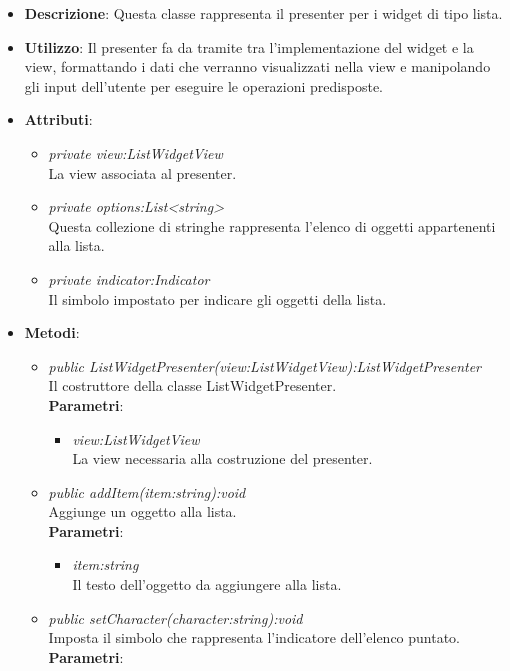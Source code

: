 \begin{itemize}
\item \textbf{Descrizione}: Questa classe rappresenta il presenter per i widget di tipo lista.
\item \textbf{Utilizzo}: Il presenter fa da tramite tra l'implementazione del widget e la view, formattando i dati che verranno visualizzati nella view e manipolando gli input dell'utente per eseguire le operazioni predisposte.
\item \textbf{Attributi}:
	\begin{itemize}
	\item \textit{private view:ListWidgetView}\\
	La view associata al presenter.
	\item \textit{private options:List<string>}\\
	Questa collezione di stringhe rappresenta l'elenco di oggetti appartenenti alla lista.
	\item \textit{private indicator:Indicator}\\
	Il simbolo impostato per indicare gli oggetti della lista.
	\end{itemize}
\item \textbf{Metodi}:
	\begin{itemize}
	\item \textit{public ListWidgetPresenter(view:ListWidgetView):ListWidgetPresenter}\\
	Il costruttore della classe ListWidgetPresenter.
		\\ \textbf{Parametri}: \begin{itemize}
		\item \textit{view:ListWidgetView}\\
		La view necessaria alla costruzione del presenter.
		\end{itemize} 
	\item \textit{public addItem(item:string):void}\\
	Aggiunge un oggetto alla lista.
		\\ \textbf{Parametri}: \begin{itemize}
		\item \textit{item:string}\\
		Il testo dell'oggetto da aggiungere alla lista.
		\end{itemize} 
	\item \textit{public setCharacter(character:string):void}\\
	Imposta il simbolo che rappresenta l'indicatore dell'elenco puntato.
		\\ \textbf{Parametri}: \begin{itemize}

\end{itemize}
\end{itemize}
\end{itemize}

